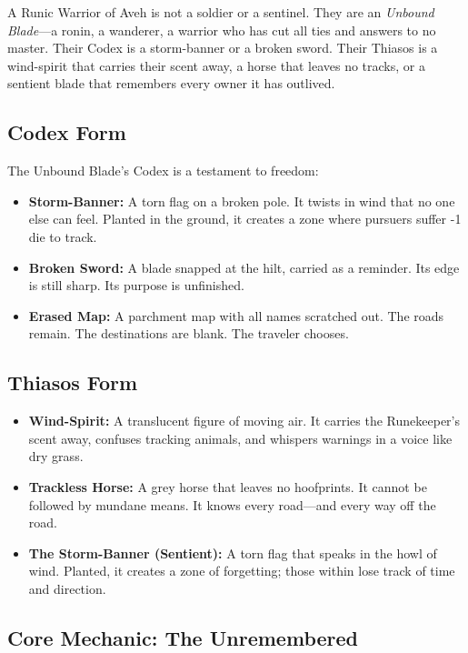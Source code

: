 A Runic Warrior of Aveh is not a soldier or a sentinel. They are an \textit{Unbound Blade}—a ronin, a wanderer, a warrior who has cut all ties and answers to no master. Their Codex is a storm-banner or a broken sword. Their Thiasos is a wind-spirit that carries their scent away, a horse that leaves no tracks, or a sentient blade that remembers every owner it has outlived.

\subsection{Codex Form}

The Unbound Blade's Codex is a testament to freedom:

\begin{itemize}
\item \textbf{Storm-Banner:} A torn flag on a broken pole. It twists in wind that no one else can feel. Planted in the ground, it creates a zone where pursuers suffer -1 die to track.
\item \textbf{Broken Sword:} A blade snapped at the hilt, carried as a reminder. Its edge is still sharp. Its purpose is unfinished.
\item \textbf{Erased Map:} A parchment map with all names scratched out. The roads remain. The destinations are blank. The traveler chooses.
\end{itemize}

\subsection{Thiasos Form}

\begin{itemize}
\item \textbf{Wind-Spirit:} A translucent figure of moving air. It carries the Runekeeper's scent away, confuses tracking animals, and whispers warnings in a voice like dry grass.
\item \textbf{Trackless Horse:} A grey horse that leaves no hoofprints. It cannot be followed by mundane means. It knows every road—and every way off the road.
\item \textbf{The Storm-Banner (Sentient):} A torn flag that speaks in the howl of wind. Planted, it creates a zone of forgetting; those within lose track of time and direction.
\end{itemize}

\subsection{Core Mechanic: The Unremembered}

